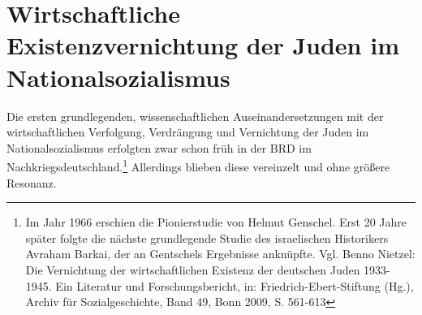 \section{Wirtschaftliche Existenzvernichtung der Juden im Nationalsozialismus}

Die ersten grundlegenden, wissenschaftlichen Auseinandersetzungen mit der wirtschaftlichen Verfolgung, Verdrängung und Vernichtung der Juden im Nationalsozialismus erfolgten zwar schon früh in der BRD im Nachkriegsdeutschland.\footnote{Im Jahr 1966 erschien die Pionierstudie von Helmut Genschel. Erst 20 Jahre später folgte die nächste grundlegende Studie des israelischen Historikers Avraham Barkai, der an Gentschels Ergebnisse anknüpfte. Vgl. Benno Nietzel: Die Vernichtung der wirtschaftlichen Existenz der deutschen Juden 1933-1945. Ein Literatur und Forschungsbericht, in: Friedrich-Ebert-Stiftung (Hg.), Archiv für Sozialgeschichte, Band 49, Bonn 2009, S. 561-613} Allerdings blieben diese vereinzelt und ohne größere Resonanz. 

